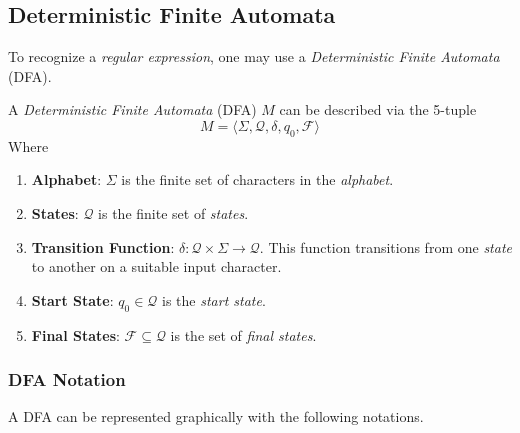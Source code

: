 \subsection{Deterministic Finite Automata}

To recognize a \textit{regular expression}, one may use a \textit{Deterministic Finite Automata} (DFA).

\begin{definition}
    A \textit{Deterministic Finite Automata} (DFA) $M$ can be described via the 5-tuple
    \begin{equation}
        M = \langle 
            \Sigma, 
            \mathcal{Q}, 
            \delta, q_0, 
            \mathcal{F} 
        \rangle
    \end{equation}
    Where
    \begin{enumerate}
        \item \textbf{Alphabet}: $\Sigma$ is the finite set of characters in the \textit{alphabet}.
        \item \textbf{States}: $\mathcal{Q}$ is the finite set of \textit{states}.
        \item \textbf{Transition Function}: $\delta \colon \mathcal{Q} \times \Sigma \to \mathcal{Q}$. This function transitions from one \textit{state} to another on a suitable input character.
        \item \textbf{Start State}: $q_0 \in \mathcal{Q}$ is the \textit{start state}.
        \item \textbf{Final States}: $\mathcal{F} \subseteq \mathcal{Q}$ is the set of \textit{final states}.
    \end{enumerate}
\end{definition}

\subsubsection{DFA Notation}

A DFA can be represented graphically with the following notations.

